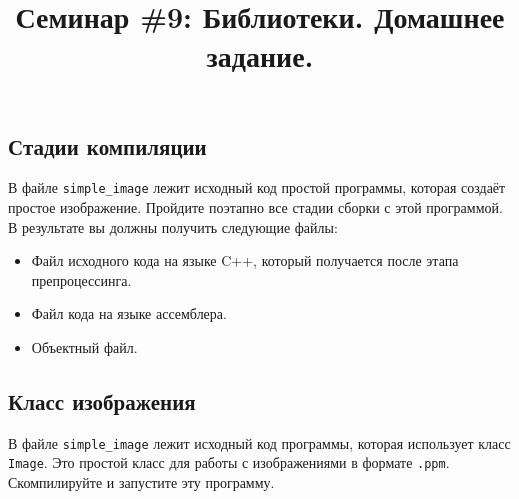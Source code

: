 \documentclass{article}
\begin{document}
\title{Семинар \#9: Библиотеки. Домашнее задание. \vspace{-5ex}}\date{}\maketitle


\subsection{Стадии компиляции}
В файле \texttt{simple\_image} лежит исходный код простой программы, которая создаёт простое изображение. Пройдите поэтапно все стадии сборки с этой программой. В результате вы должны получить следующие файлы:
\begin{itemize}
\item Файл исходного кода на языке C++, который получается после этапа препроцессинга.
\item Файл кода на языке ассемблера.
\item Объектный файл.
\end{itemize}



\subsection{Класс изображения}

В файле \texttt{simple\_image} лежит исходный код программы, которая использует класс \texttt{Image}. Это простой класс для работы с изображениями в формате \texttt{.ppm}. Скомпилируйте и запустите эту программу.
 
\end{document}
